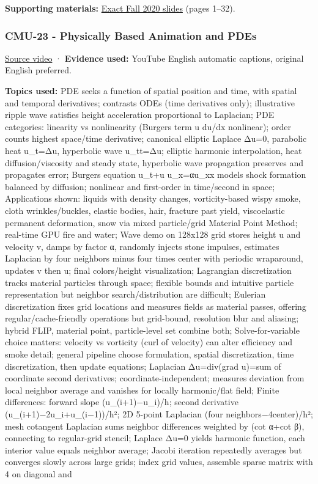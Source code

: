 \textbf{Supporting materials:} \href{https://15462.courses.cs.cmu.edu/fall2020content/lectures/22_optimization/22_optimization_slides.pdf}{Exact Fall 2020 slides} (pages 1--32).

\subsubsection{CMU-23 - Physically Based Animation and PDEs}\label{04-visual-computing-ii-ch036-cmu-23---physically-based-animation-and-pdes}

\href{https://www.youtube.com/watch?v=gqdXsw_Q_as}{Source video} · \textbf{Evidence used:} YouTube English automatic captions, original English preferred.

\textbf{Topics used:} PDE seeks a function of spatial position and time, with spatial and temporal derivatives; contrasts ODEs (time derivatives only); illustrative ripple wave satisfies height acceleration proportional to Laplacian; PDE categories: linearity vs nonlinearity (Burgers term u du/dx nonlinear); order counts highest space/time derivative; canonical elliptic Laplace Δu=0, parabolic heat u\_t=Δu, hyperbolic wave u\_tt=Δu; elliptic harmonic interpolation, heat diffusion/viscosity and steady state, hyperbolic wave propagation preserves and propagates error; Burgers equation u\_t+u u\_x=αu\_xx models shock formation balanced by diffusion; nonlinear and first-order in time/second in space; Applications shown: liquids with density changes, vorticity-based wispy smoke, cloth wrinkles/buckles, elastic bodies, hair, fracture past yield, viscoelastic permanent deformation, snow via mixed particle/grid Material Point Method; real-time GPU fire and water; Wave demo on 128x128 grid stores height u and velocity v, damps by factor α, randomly injects stone impulses, estimates Laplacian by four neighbors minus four times center with periodic wraparound, updates v then u; final colors/height visualization; Lagrangian discretization tracks material particles through space; flexible bounds and intuitive particle representation but neighbor search/distribution are difficult; Eulerian discretization fixes grid locations and measures fields as material passes, offering regular/cache-friendly operations but grid-bound, resolution blur and aliasing; hybrid FLIP, material point, particle-level set combine both; Solve-for-variable choice matters: velocity vs vorticity (curl of velocity) can alter efficiency and smoke detail; general pipeline choose formulation, spatial discretization, time discretization, then update equations; Laplacian Δu=div(grad u)=sum of coordinate second derivatives; coordinate-independent; measures deviation from local neighbor average and vanishes for locally harmonic/flat field; Finite differences: forward slope (u\_(i+1)−u\_i)/h; second derivative (u\_(i+1)−2u\_i+u\_(i−1))/h²; 2D 5-point Laplacian (four neighbors−4center)/h²; mesh cotangent Laplacian sums neighbor differences weighted by (cot α+cot β), connecting to regular-grid stencil; Laplace Δu=0 yields harmonic function, each interior value equals neighbor average; Jacobi iteration repeatedly averages but converges slowly across large grids; index grid values, assemble sparse matrix with 4 on diagonal and 